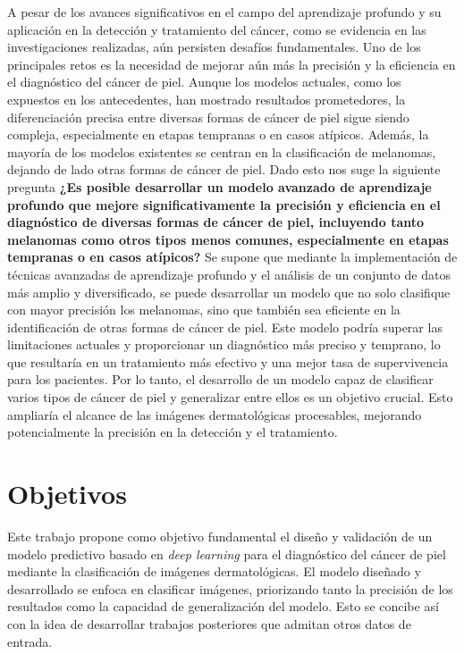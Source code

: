 A pesar de los avances significativos en el campo del aprendizaje profundo y su aplicación en la detección y tratamiento del cáncer, como se evidencia en las investigaciones realizadas, aún persisten desafíos fundamentales. Uno de los principales retos es la necesidad de mejorar aún más la precisión y la eficiencia en el diagnóstico del cáncer de piel. Aunque los modelos actuales, como los expuestos en los antecedentes, han mostrado resultados prometedores, la diferenciación precisa entre diversas formas de cáncer de piel sigue siendo compleja, especialmente en etapas tempranas o en casos atípicos. Además, la mayoría de los modelos existentes se centran en la clasificación de melanomas, dejando de lado otras formas de cáncer de piel. Dado esto nos suge la siguiente pregunta \textbf{¿Es posible desarrollar un modelo avanzado de aprendizaje profundo que mejore significativamente la precisión y eficiencia en el diagnóstico de diversas formas de cáncer de piel, incluyendo tanto melanomas como otros tipos menos comunes, especialmente en etapas tempranas o en casos atípicos?} Se supone que mediante la implementación de técnicas avanzadas de aprendizaje profundo y el análisis de un conjunto de datos más amplio y diversificado, se puede desarrollar un modelo que no solo clasifique con mayor precisión los melanomas, sino que también sea eficiente en la identificación de otras formas de cáncer de piel. Este modelo podría superar las limitaciones actuales y proporcionar un diagnóstico más preciso y temprano, lo que resultaría en un tratamiento más efectivo y una mejor tasa de supervivencia para los pacientes. Por lo tanto, el desarrollo de un modelo capaz de clasificar varios tipos de cáncer de piel y generalizar entre ellos es un objetivo crucial. Esto ampliaría el alcance de las imágenes dermatológicas procesables, mejorando potencialmente la precisión en la detección y el tratamiento.

\section*{Objetivos}

Este trabajo propone como objetivo fundamental el diseño y validación de un modelo predictivo basado en \textit{deep learning} para el diagnóstico del cáncer de piel mediante la clasificación de imágenes dermatológicas. El modelo diseñado y desarrollado se enfoca en clasificar imágenes, priorizando tanto la precisión de los resultados como la capacidad de generalización del modelo. Esto se concibe así con la idea de desarrollar trabajos posteriores que admitan otros datos de entrada. \\


